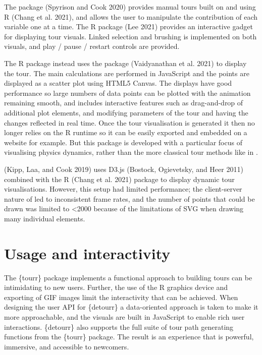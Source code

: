 The  package (Spyrison and Cook 2020) provides manual tours built on  and using R  (Chang et al. 2021), and allows the user to manipulate the contribution of each variable one at a time. The  R package (Lee 2021) provides an interactive gadget for displaying tour visuals. Linked selection and brushing is implemented on both visuals, and play / pause / restart controls are provided.

The  R package instead uses the  package (Vaidyanathan et al. 2021) to display the tour. The main calculations are performed in JavaScript and the points are displayed as a scatter plot using HTML5 Canvas. The displays have good performance so large numbers of data points can be plotted with the animation remaining smooth, and includes interactive features such as drag-and-drop of additional plot elements, and modifying parameters of the tour and having the changes reflected in real time. Once the tour visualisation is generated it then no longer relies on the R runtime so it can be easily exported and embedded on a website for example. But this package is developed with a particular focus of visualising physics dynamics, rather than the more classical tour methods like in .

(Kipp, Laa, and Cook 2019) uses D3.js (Bostock, Ogievetsky, and Heer 2011) combined with the R  (Chang et al. 2021) package to display dynamic tour visualisations. However, this setup had limited performance; the client-server nature of  led to inconsistent frame rates, and the number of points that could be drawn was limited to \textless2000 because of the limitations of SVG when drawing many individual elements.

\hypertarget{usage-and-interactivity}{%
\section{Usage and interactivity}\label{usage-and-interactivity}}

The \{tourr\} package implements a functional approach to building tours can be intimidating to new users. Further, the use of the R graphics device and exporting of GIF images limit the interactivity that can be achieved. When designing the user API for \{detourr\} a data-oriented approach is taken to make it more approachable, and the visuals are built in JavaScript to enable rich user interactions. \{detourr\} also supports the full suite of tour path generating functions from the \{tourr\} package. The result is an experience that is powerful, immersive, and accessible to newcomers.

